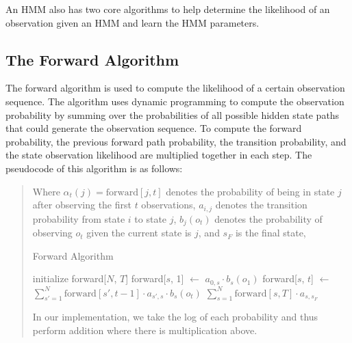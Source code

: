 \documentclass{article}
\begin{document}
An HMM also has two core algorithms to help determine the likelihood of an observation given an HMM and learn the HMM parameters.

\subsection{The Forward Algorithm}\label{sec:forward-alg}

The forward algorithm is used to compute the likelihood of a certain observation sequence. The algorithm uses dynamic programming to compute the observation probability by summing over the probabilities of all possible hidden state paths that could generate the observation sequence. To compute the forward probability, the previous forward path probability, the transition probability, and the state observation likelihood are multiplied together in each step. The pseudocode of this algorithm is as follows:

\begin{quote}
Where $\alpha_t(j) = \text{forward}[j, t]$ denotes the probability of being in state $j$ after observing the first $t$ observations, $a_{i,j}$ denotes the transition probability from state $i$ to state $j$, $b_j(o_t)$ denotes the probability of observing $o_t$ given the current state is $j$, and $s_F$ is the final state,
\begin{algorithm}
\caption{Forward Algorithm}
\begin{algorithmic}
    \State initialize forward[$N$, $T$]
        \State forward[$s$, 1] $\gets$ $a_{0, s} \cdot b_s (o_1)$
    \EndFor
            \State forward[$s$, $t$] $\gets$ 
            $\displaystyle \sum_{s' = 1}^{N} \text{forward}[s', t - 1]
                                             \cdot a_{s', s} \cdot b_s(o_t)$
        \EndFor
    \EndFor
    \Return $\sum_{s = 1}^{N} \text{forward}[s, T] \cdot a_{s, s_F}$
    \EndProcedure
\end{algorithmic}
\end{algorithm}

In our implementation, we take the log of each probability and thus perform addition where there is multiplication above.
\end{quote}

\end{document}
